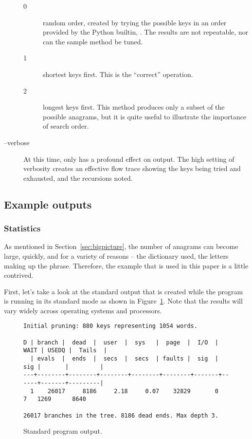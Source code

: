 \documentclass[letterpaper, 11pt]{article}
\begin{document}
\begin{description}
\begin{description}
\item[0] random order, created by trying the possible keys in 
an order provided by the Python builtin, . The
results are not repeatable, nor can the sample method be tuned.

\item[1] shortest keys first. This is the ``correct''
operation.

\item[2] longest keys first. This method produces only a subset of
the possible anagrams, but it is quite useful to illustrate the
importance of search order.

\end{description}

\item[--verbose] At this time, only  has a profound
effect on output. The high setting of verbosity creates an effective
flow trace showing the keys being tried and exhausted, and the
recursions noted.

\end{description}

\subsection{Example outputs}

\subsubsection{Statistics}

As mentioned in Section~\ref{sec:bigpicture}, the number of anagrams
can become large, quickly, and for a variety of reasons -- the
dictionary used, the letters making up the phrase. Therefore, the
example that is used in this paper is a little contrived.

First, let's take a look at the standard output that is created
while the program is running in its standard mode as shown
in Figure~\ref{fig:stdoutput}.  Note that the
results will vary widely across operating systems and processors.

\begin{figure}
\small
\begin{verbatim}
Initial pruning: 880 keys representing 1054 words.

D | branch |  dead  |  user  |  sys   |  page  |  I/O  | WAIT | USEDQ |  Tails  |
  | evals  |  ends  |  secs  |  secs  | faults |  sig  |  sig |       |         |
---+--------+--------+--------+--------+--------+-------+------+-------+---------|
  1    26017     8186     2.18     0.07    32829       0      7   1269      8640

26017 branches in the tree. 8186 dead ends. Max depth 3.
\end{verbatim}
\normalsize
\caption{Standard program output.}
\label{fig:stdoutput}
\end{figure}
\end{document}
